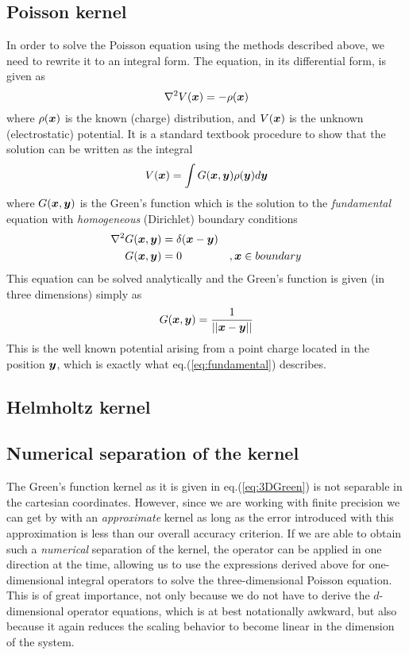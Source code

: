 \subsection{Poisson kernel}
In order to solve the Poisson equation using the methods described above, we
need to rewrite it to an integral form. The equation, in its differential
form, is given as
\begin{equation}
	\nabla^2 V(\boldsymbol x) = -\rho(\boldsymbol x)
\end{equation}
where $\rho(\boldsymbol x)$ is the known (charge) distribution, and
$V(\boldsymbol x)$ is the unknown (electrostatic) potential. It is a standard
textbook procedure to show that the solution can be written as the integral
\begin{equation}
	V(\boldsymbol x) = \int G(\boldsymbol x,\boldsymbol y)\rho(\boldsymbol y)d\boldsymbol y
\end{equation}
where $G(\boldsymbol x,\boldsymbol y)$ is the Green's function which
is the solution to the \emph{fundamental} equation with \emph{homogeneous}
(Dirichlet) boundary conditions
\begin{eqnarray}
	\label{eq:fundamental}
	\begin{split}
	\nabla^2 G(\boldsymbol x,\boldsymbol y) &= \delta(\boldsymbol x-\boldsymbol y)&\\
	G(\boldsymbol x,\boldsymbol y) &= 0 &,\boldsymbol x \in boundary
	\end{split}
\end{eqnarray}
This equation can be solved analytically and the Green's function is given
(in three dimensions) simply as
\begin{equation}
	\label{eq:3DGreen}
	G(\boldsymbol x,\boldsymbol y) = \frac{1}{||\boldsymbol x-\boldsymbol y||}
\end{equation}
This is the well known potential arising from a point charge located in the 
position $\boldsymbol y$, which is exactly what eq.(\ref{eq:fundamental})
describes.

\subsection{Helmholtz kernel}

\subsection*{Numerical separation of the kernel}
The Green's function kernel as it is given in eq.(\ref{eq:3DGreen}) is not 
separable in the cartesian coordinates. However, since we are working with
finite precision we can get by with an \emph{approximate} kernel as long as
the error introduced with this approximation is less than our overall accuracy
criterion. If we are able to obtain such a \emph{numerical} separation of the
kernel, the operator can be applied in one direction at the time, allowing us 
to use the expressions derived above for one-dimensional integral operators to 
solve the three-dimensional Poisson equation. This is of great importance, not 
only because we do not have to derive the $d$-dimensional operator equations, 
which is at best notationally awkward, but also because it again reduces the 
scaling behavior to become linear in the dimension of the system.\\

